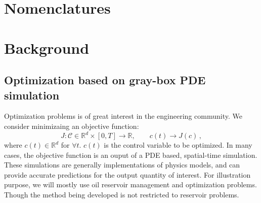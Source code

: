 \documentclass[a4paper,onecolumn]{article}
\theoremstyle{remark}
\begin{document}
\newpage
\tableofcontents

\newpage
\section{Nomenclatures}

\newpage
\section{Background}
\label{intro}

\subsection{Optimization based on gray-box PDE simulation}
Optimization problems is of great interest in the engineering community. We consider minimizaing an
objective function:
$$
    J: \mathcal{C} \in \mathbb{R}^d\times [0,T] \rightarrow \mathbb{R}, \qquad c(t) \rightarrow J(c)\,,
$$
where $c(t) \in \mathbb{R}^d$ for $\forall t$. $c(t)$ is the control variable to be optimized.
In many cases, the objective function is an ouput of
a PDE based, spatial-time simulation. 
These simulations are generally implementations of physics models, and can provide accurate predictions for
the output quantity of interest.
For illustration purpose, we will mostly use oil reservoir management and optimization problems.
Though the method being developed is not restricted to reservoir problems.\\
\end{document}
